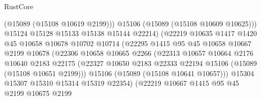 \begin{lexlean}{RustCore}
\begin{coremodule}
                                    (@15089 (@15108 @10619 @2199)))
                                  @15106
                                  (@15089 (@15108 @10609 @10625)))
                                @15124
                                @15128
                                @15133
                                @15138
                                @15144
                                @22214)
                              (@22219
                                @10635
                                @1417
                                @1420
                                @45
                                @10658
                                @10678
                                @10702
                                @10714
                                (@22295
                                  @1415
                                  @95
                                  @45
                                  @10658
                                  @10667
                                  @2199
                                  @10678
                                  (@22306
                                    @10658
                                    @10665
                                    @2266
                                    (@22313
                                      @10657
                                      @10664
                                      @2176
                                      @10640
                                      @2183
                                      @22175
                                      (@22327
                                        @10650
                                        @2183
                                        @22333
                                        @22194
                                        @15106
                                        (@15089 (@15108 @10651 @2199)))
                                      @15106
                                      (@15089 (@15108 @10641 @10657)))
                                    @15304
                                    @15307
                                    @15310
                                    @15314
                                    @15319
                                    @22354)
                                  (@22219
                                    @10667
                                    @1415
                                    @95
                                    @45
                                    @2199
                                    @10675
                                    @2199

\end{coremodule}
\end{lexlean}

